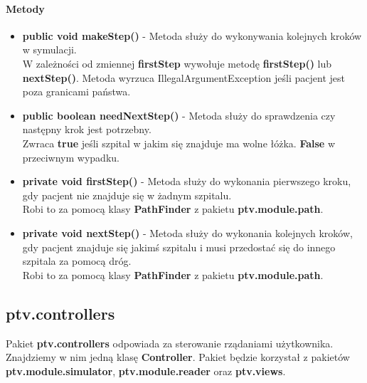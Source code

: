 \documentclass[]{article}
\begin{document}
                \paragraph{Metody}
                    \begin{itemize}
                        \item \textbf{public void makeStep()} - 
                            Metoda służy do wykonywania kolejnych kroków w symulacji.\\
                            W zależności od zmiennej \textbf{firstStep} wywołuje metodę \textbf{firstStep()} lub \textbf{nextStep()}.
                            Metoda wyrzuca IllegalArgumentException jeśli pacjent jest poza granicami państwa.
                        
                        \item \textbf{public boolean needNextStep()} - 
                            Metoda służy do sprawdzenia czy następny krok jest potrzebny.\\
                            Zwraca \textbf{true} jeśli szpital w jakim się znajduje ma wolne łóżka. \textbf{False} w przeciwnym wypadku.
                            
                        \item \textbf{private void firstStep()} - 
                            Metoda służy do wykonania pierwszego kroku, gdy pacjent nie znajduje się w żadnym szpitalu.\\
                            Robi to za pomocą klasy \textbf{PathFinder} z pakietu \textbf{ptv.module.path}.
                        \item \textbf{private void nextStep()} - 
                            Metoda służy do wykonania kolejnych kroków, gdy pacjent znajduje się jakimś szpitalu i musi przedostać się do innego szpitala za pomocą dróg.\\
                            Robi to za pomocą klasy \textbf{PathFinder} z pakietu \textbf{ptv.module.path}.
                    \end{itemize}
        
        \subsection{ptv.controllers} %
        Pakiet \textbf{ptv.controllers} odpowiada za sterowanie rządaniami użytkownika. Znajdziemy w nim jedną klasę \textbf{Controller}. Pakiet będzie korzystał z pakietów \textbf{ptv.module.simulator}, \textbf{ptv.module.reader} oraz \textbf{ptv.views}.
\end{document}
